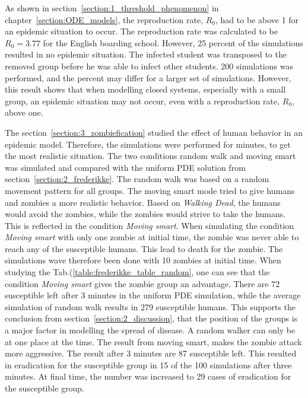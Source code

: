 \documentclass[%
twoside,                 %
final,                   %
chapterprefix=true,      %
open=right               %
10pt]{book}
\begin{document}
\vspace{3mm}




\vspace{3mm}


As shown in section~\ref{section:1_threshold_phenomenon} in chapter~\ref{section:ODE_models}, the reproduction rate, $R_0$, had to be above 1 for an epidemic situation to occur. The reproduction rate was calculated to be $R_0=3.77$ for the English boarding school. However, 25 percent of the simulations resulted in no epidemic situation. The infected student was transposed to the removed group before he was able to infect other students. 200 simulations was performed, and the percent may differ for a larger set of simulations. However, this result shows that when modelling closed systems, especially with a small group, an epidemic situation may not occur, even with a reproduction rate, $R_0$, above one. 


\vspace{3mm}




\vspace{3mm}


The section~\ref{section:3_zombiefication} studied the effect of human behavior in an epidemic model. Therefore, the simulations were performed for minutes, to get the most realistic situation. The two conditions random walk and moving smart was simulated and compared with the uniform PDE solution from section~\ref{section:2_frederikke}. The random walk was based on a random movement pattern for all groups. The moving smart mode tried to give humans and zombies a more realistic behavior. Based on \emph{Walking Dead}, the humans would avoid the zombies, while the zombies would strive to take the humans. This is reflected in the condition \emph{Moving smart}. When simulating the condition \emph{Moving smart} with only one zombie at initial time, the zombie was never able to reach any of the susceptible humans. This lead to death for the zombie. The simulations wave therefore been done with 10 zombies at initial time. When studying the Tab.(\ref{table:frederikke_table_random}, one can see that the condition \emph{Moving smart} gives the zombie group an advantage. There are 72 susceptible left after 3 minutes in the uniform PDE simulation, while the average simulation of random walk results in 279 susceptible humans. This supports the conclusion from section~\ref{section:2_discussion}, that the position of the groups is a major factor in modelling the spread of disease. A random walker can only be at one place at the time. The result from moving smart, makes the zombie attack more aggressive. The result after 3 minutes are 87 susceptible left. This resulted in eradication for the susceptible group in 15 of the 100 simulations after three minutes. At final time, the number was increased to 29 cases of eradication for the susceptible group.       
\end{document}
